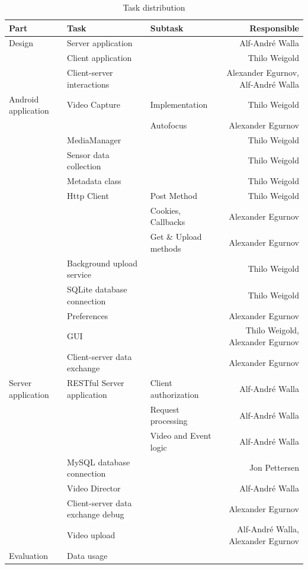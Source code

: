 \documentclass[conference]{IEEEtran}
\begin{document}
\begin{table}[t]
	\centering
	\renewcommand{\arraystretch}{1.5}
	\caption{Task distribution}
	\label{tab:task_distr}
	\begin{tabular}{lllr}
		\toprule
		Part & Task & Subtask & Responsible \\
		\midrule
		Design
			& Server application & & Alf-André Walla \\
			& Client application & & Thilo Weigold \\
			& Client-server interactions & & Alexander Egurnov, Alf-André Walla \\
		\midrule
		Android application
			& Video Capture & Implementation & Thilo Weigold \\
			&       & Autofocus & Alexander Egurnov \\
			& MediaManager & & Thilo Weigold \\
			& Sensor data collection & & Thilo Weigold \\
			& Metadata class & & Thilo Weigold \\
			& Http Client & Post Method & Thilo Weigold \\
			&       & Cookies, Callbacks & Alexander Egurnov \\
			&       & Get \& Upload methods & Alexander Egurnov \\
			& Background upload service & & Thilo Weigold \\
			& SQLite database connection & & Thilo Weigold \\
			& Preferences & & Alexander Egurnov \\
			& GUI & & Thilo Weigold, Alexander Egurnov \\
			& Client-server data exchange & & Alexander Egurnov \\
		\midrule
		Server application 
			& RESTful Server application & Client authorization & Alf-André Walla \\
			&       & Request processing & Alf-André Walla \\
			&       & Video and Event logic & Alf-André Walla \\
			& MySQL database connection & & Jon Pettersen \\
			& Video Director & & Alf-André Walla \\
			& Client-server data exchange debug & & Alexander Egurnov \\
			& Video upload & & Alf-André Walla, Alexander Egurnov \\
		\midrule
		Evaluation
			& Data usage & & \\

\end{tabular}
\end{table}
\end{document}
